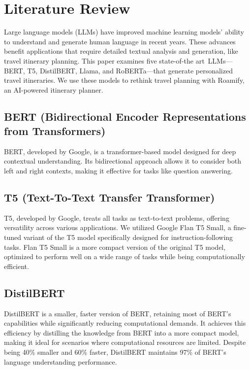 \documentclass[conference]{IEEEtran}
\begin{document}
\section{Literature Review}

    Large language models (LLMs) have improved machine learning models' ability to understand and generate human language in recent years. These advances benefit applications that require detailed textual analysis and generation, like travel itinerary planning. This paper examines five state-of-the art LLMs—BERT, T5, DistilBERT, Llama, and RoBERTa—that generate personalized travel itineraries. We use these models to rethink travel planning with Roamify, an AI-powered itinerary planner.

    \subsection{BERT (Bidirectional Encoder Representations from Transformers)}
BERT, developed by Google, is a transformer-based model designed for deep contextual understanding. Its bidirectional approach allows it to consider both left and right contexts, making it effective for tasks like question answering.

\subsection{T5 (Text-To-Text Transfer Transformer)}
T5, developed by Google, treats all tasks as text-to-text problems, offering versatility across various applications. We utilized Google Flan T5 Small, a fine-tuned variant of the T5 model specifically designed for instruction-following tasks. Flan T5 Small is a more compact version of the original T5 model, optimized to perform well on a wide range of tasks while being computationally efficient.

\subsection{DistilBERT}
DistilBERT is a smaller, faster version of BERT, retaining most of BERT's capabilities while significantly reducing computational demands. It achieves this efficiency by distilling the knowledge from BERT into a more compact model, making it ideal for scenarios where computational resources are limited. Despite being 40\% smaller and 60\% faster, DistilBERT maintains 97\% of BERT's language understanding performance.
\end{document}
